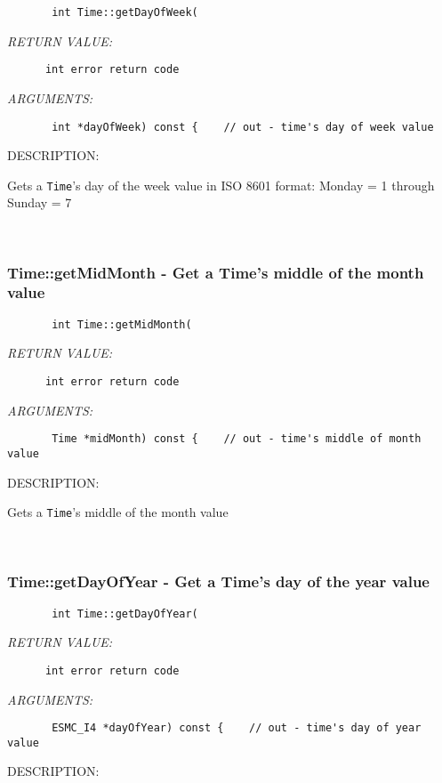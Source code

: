   
\begin{verbatim}       int Time::getDayOfWeek(\end{verbatim}{\em RETURN VALUE:}
\begin{verbatim}      int error return code\end{verbatim}{\em ARGUMENTS:}
\begin{verbatim}       int *dayOfWeek) const {    // out - time's day of week value\end{verbatim}
{\sf DESCRIPTION:\\ }


        Gets a {\tt Time}'s day of the week value in ISO 8601 format:
        Monday = 1 through Sunday = 7
   
 
\mbox{}\hrulefill\ 
 
\subsubsection [Time::getMidMonth] {Time::getMidMonth - Get a Time's middle of the month value}


  
\begin{verbatim}       int Time::getMidMonth(\end{verbatim}{\em RETURN VALUE:}
\begin{verbatim}      int error return code\end{verbatim}{\em ARGUMENTS:}
\begin{verbatim}       Time *midMonth) const {    // out - time's middle of month value\end{verbatim}
{\sf DESCRIPTION:\\ }


        Gets a {\tt Time}'s middle of the month value
   
 
\mbox{}\hrulefill\ 
 
\subsubsection [Time::getDayOfYear] {Time::getDayOfYear - Get a Time's day of the year value}


  
\begin{verbatim}       int Time::getDayOfYear(\end{verbatim}{\em RETURN VALUE:}
\begin{verbatim}      int error return code\end{verbatim}{\em ARGUMENTS:}
\begin{verbatim}       ESMC_I4 *dayOfYear) const {    // out - time's day of year value\end{verbatim}
{\sf DESCRIPTION:\\ }


